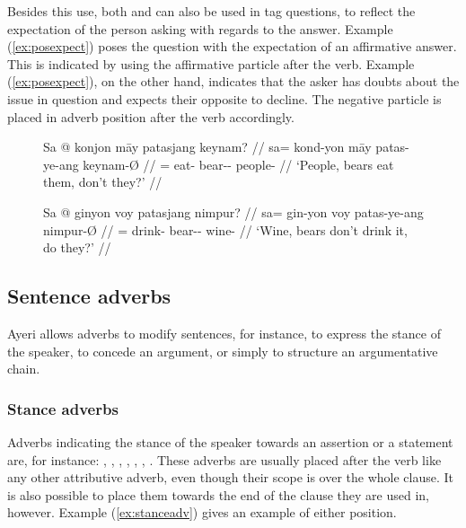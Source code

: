 Besides this use, both  and  can also be used in
tag questions, to reflect the expectation of the person asking with regards to
the answer. Example (\ref{ex:posexpect}) poses the question with the
expectation of an affirmative answer. This is indicated by using the
affirmative particle  after the verb. Example 
(\ref{ex:posexpect}), on the other hand, indicates that the asker has doubts
about the issue in question and expects their opposite to decline. The negative
particle  is placed in adverb position after the verb
accordingly.

\begin{figure}[h]
\pex
\a\label{ex:posexpect}\begingl
	\gla Sa @ konjon māy patasjang keynam? //
	\glb sa= kond-yon māy patas-ye-ang keynam-Ø //
	\glc \PatT{}= eat-\TplN{} \Aff{} bear-\Pl{}-\Aarg{} people-\Top{} //
	\glft `People, bears eat them, don't they?' //
\endgl

\a\label{ex:negexpect}\begingl
	\gla Sa @ ginyon voy patasjang nimpur? //
	\glb sa= gin-yon voy patas-ye-ang nimpur-Ø //
	\glc \PatT{}= drink-\TplN{} \Neg{} bear-\Pl{}-\Aarg{} wine-\Top{} //
	\glft `Wine, bears don't drink it, do they?' //
\endgl
\xe
\end{figure}


\subsection{Sentence adverbs}

Ayeri allows adverbs to modify sentences, for instance, to express the stance
of the speaker, to concede an argument, or simply to structure an argumentative
chain.

\subsubsection{Stance adverbs}

Adverbs indicating the stance of the speaker towards an assertion or a 
statement are, for instance:
, 
,
,
,
,
,
.
These adverbs are usually placed after the verb like any other attributive 
adverb, even though their scope is over the whole clause. It is also possible 
to place them towards the end of the clause they are used in, however. Example 
(\ref{ex:stanceadv}) gives an example of either position.

